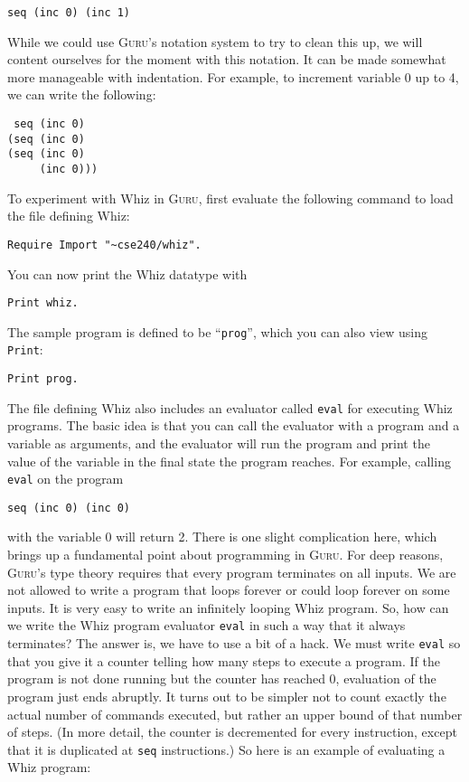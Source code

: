 \documentclass{book}[12pt]
\newcommand{\guru}[0]{\textsc{Guru}}
\begin{document}
\begin{verbatim}
seq (inc 0) (inc 1)
\end{verbatim}

\noindent While we could use \guru's notation system to try to clean
this up, we will content ourselves for the moment with this notation.
It can be made somewhat more manageable with indentation.  For example,
to increment variable 0 up to 4, we can write the following:

\begin{verbatim}
 seq (inc 0)
(seq (inc 0)
(seq (inc 0)
     (inc 0)))
\end{verbatim}

\noindent To experiment with Whiz in \guru, first evaluate the following
command to load the file defining Whiz:

\begin{verbatim}
Require Import "~cse240/whiz".
\end{verbatim}

\noindent You can now print the Whiz datatype with

\begin{verbatim}
Print whiz.
\end{verbatim}

\noindent The sample program is defined to be ``\texttt{prog}'', which
you can also view using \texttt{Print}:

\begin{verbatim}
Print prog.
\end{verbatim}

\noindent The file defining Whiz also includes an evaluator called
\texttt{eval} for executing Whiz programs.  The basic idea is that
you can call the evaluator with a program and a variable as arguments,
and the evaluator will run the program and print the value of the
variable in the final state the program reaches.  For example,
calling \texttt{eval} on the program 

\begin{verbatim}
seq (inc 0) (inc 0)
\end{verbatim}

\noindent with the variable 0 will return 2.  There is one slight
complication here, which brings up a fundamental point about
programming in \guru.  For deep reasons, \guru's type theory requires that
every program terminates on all inputs.  We are not allowed to write a
program that loops forever or could loop forever on some inputs.  It
is very easy to write an infinitely looping Whiz program.  So, how can
we write the Whiz program evaluator \texttt{eval} in such a way that
it always terminates?  The answer is, we have to use a bit of a hack.
We must write \texttt{eval} so that you give it a counter telling how
many steps to execute a program.  If the program is not done running
but the counter has reached 0, evaluation of the program just ends
abruptly.  It turns out to be simpler not to count exactly the actual
number of commands executed, but rather an upper bound of that number
of steps.  (In more detail, the counter is decremented for every
instruction, except that it is duplicated at \texttt{seq}
instructions.) So here is an example of evaluating a Whiz program:
\end{document}
